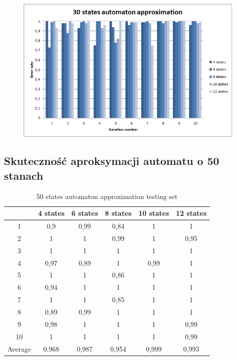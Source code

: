 \documentclass[runningheads,a4paper]{llncs}
\begin{document}
\begin{figure}
\centering
\includegraphics[scale=1]{8.png}
\end{figure}

\FloatBarrier
\subsection{Skuteczność aproksymacji automatu o 50 stanach}

\begin{table}[]
\centering
\caption{50 states automaton approximation testing set}
\label{my-label}
\begin{tabular}{@{}cccccc@{}}
\toprule
        & 4 states & 6 states & 8 states & 10 states & 12 states    \\ \midrule
1       & 0,9      & 0,99     & 0,84     & 1         & 1 \\
2       & 1        & 1        & 0,99     & 1         & 0,95 \\
3       & 1        & 1        & 1        & 1         & 1 \\
4       & 0,97     & 0,89     & 1        & 0,99      & 1   \\
5       & 1        & 1        & 0,86     & 1         & 1   \\
6       & 0,94     & 1        & 1        & 1         & 1    \\
7       & 1        & 1        & 0,85     & 1         & 1    \\
8       & 0,89     & 0,99     & 1        & 1         & 1     \\
9       & 0,98     & 1        & 1        & 1         & 0,99 \\
10      & 1        & 1        & 1        & 1         & 0,99  \\
Average & 0,968    & 0,987    & 0,954    & 0,999     & 0,993  \\ \bottomrule
\end{tabular}
\end{table}
\end{document}
